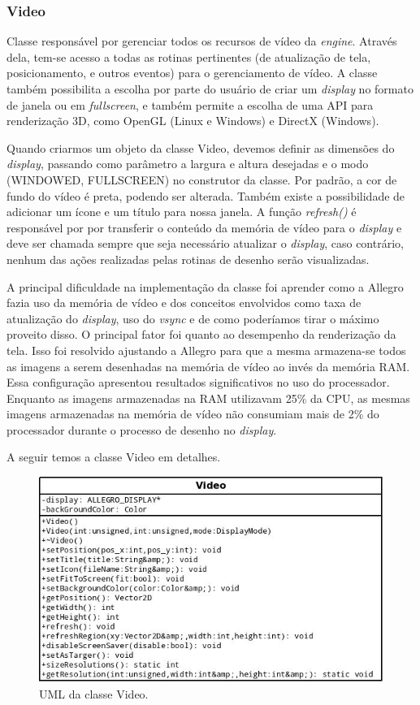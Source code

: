 \subsubsection{Video}
%
%
Classe responsável por gerenciar todos os recursos de vídeo da \textit{engine}. Através dela, tem-se acesso a todas as rotinas pertinentes (de atualização de tela, posicionamento, e outros eventos) para o gerenciamento de vídeo. A classe também possibilita a escolha por parte do usuário de criar um \textit{display} no formato de janela ou em \textit{fullscreen}, e também permite a escolha de uma API para renderização 3D, como OpenGL (Linux e Windows) e DirectX (Windows). 
\par 
Quando criarmos um objeto da classe Video, devemos definir as dimensões do \textit{display}, passando como parâmetro a largura e altura desejadas  e o modo (WINDOWED, FULLSCREEN) no construtor da classe. Por padrão, a cor de fundo do vídeo é preta, podendo ser alterada. Também existe a possibilidade de adicionar um ícone e um título para nossa janela. A função \textit{refresh()} é responsável por por transferir o conteúdo da memória de vídeo para o \textit{display} e deve ser chamada sempre que seja necessário atualizar o \textit{display}, caso contrário, nenhum das ações realizadas pelas rotinas de desenho serão visualizadas. 
\par 
A principal dificuldade na implementação da classe foi aprender como a Allegro fazia uso da memória de vídeo e dos conceitos envolvidos como taxa de atualização do \textit{display}, uso do \textit{vsync} e de como poderíamos tirar o máximo proveito disso. O principal fator foi quanto ao desempenho da renderização da tela. Isso foi resolvido ajustando a Allegro para que a mesma armazena-se todos as imagens a serem desenhadas na memória de vídeo ao invés da memória RAM. Essa configuração apresentou resultados significativos no uso do processador. Enquanto as imagens armazenadas na RAM utilizavam 25\% da CPU, as mesmas imagens armazenadas na memória de vídeo não consumiam mais de 2\% do processador durante o processo de desenho no \textit{display}.
\par
A seguir temos a classe Video em detalhes.
%
%
%
%
\begin{figure}[H]
    \centering
    \includegraphics[scale = 0.5]{uml/video.jpeg}
    \caption{UML da classe Video.}
    \label{umlVideo}
\end{figure}
